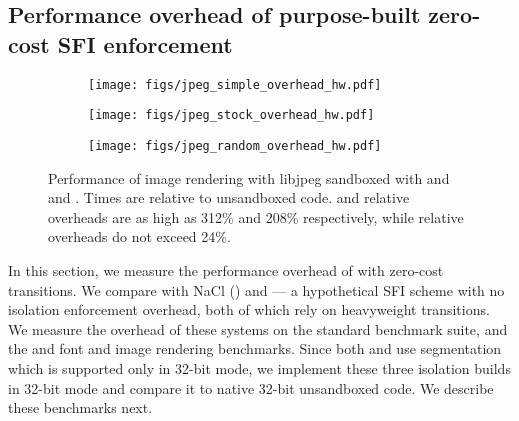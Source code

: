 
\subsection{Performance overhead of purpose-built zero-cost SFI enforcement}

\label{subsec:eval-zerocostsfi}

\begin{figure*}
  
  \begin{subfigure}{0.32\textwidth}
    \texttt{[image: figs/jpeg\_simple\_overhead\_hw.pdf]}
    \caption{\simplejpeg}
    \label{fig:jpeg-simpleimg-hw}
  \end{subfigure}
  \begin{subfigure}{0.32\textwidth}
    \texttt{[image: figs/jpeg\_stock\_overhead\_hw.pdf]}
    \caption{\stockjpeg}
    \label{fig:jpeg-stockimg-hw}
  \end{subfigure}
  \begin{subfigure}{0.32\textwidth}
    \texttt{[image: figs/jpeg\_random\_overhead\_hw.pdf]}
    \caption{\randomjpeg}
    \label{fig:jpeg-randomimg-hw}
  \end{subfigure}
  
  \caption{
    Performance of image rendering with libjpeg sandboxed with
    \trsegmentsfi and \trnacl and \tridealheavy.
    Times are relative to unsandboxed code.
    \trnacl and \tridealheavy relative overheads are as high as 312\% and 208\% 
    respectively, while \trsegmentsfi relative overheads do not exceed 24\%.  }
  \label{fig:jpeg-img-hw}
  
\end{figure*}


In this section, we measure the performance overhead of \trsegmentsfi with
zero-cost transitions.
%
We compare \trsegmentsfi with NaCl (\trnacl) and \tridealheavy --- a
hypothetical SFI scheme with no isolation enforcement overhead, both of which
rely on heavyweight transitions.
%
We measure the overhead of these systems on the standard \SPECOhSix benchmark
suite, and the \libgraphite and \libjpeg font and image rendering benchmarks.
%
Since both \trsegmentsfi and \trnacl use segmentation which is supported only 
in 32-bit mode, we implement these three isolation builds in 32-bit mode and 
compare it to native 32-bit unsandboxed code.
%
We describe these benchmarks next.


